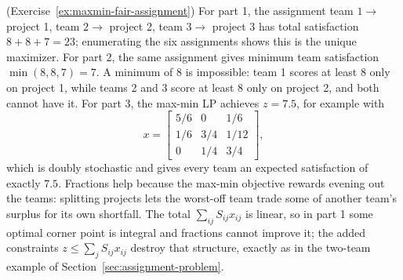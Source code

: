 \begin{solution}(Exercise~\ref{ex:maxmin-fair-assignment})
For part 1, the assignment team $1 \to$ project 1, team $2 \to$ project 2, team $3 \to$ project 3 has total satisfaction $8 + 8 + 7 = 23$; enumerating the six assignments shows this is the unique maximizer.  For part 2, the same assignment gives minimum team satisfaction $\min(8,8,7) = 7$.  A minimum of $8$ is impossible: team 1 scores at least $8$ only on project 1, while teams 2 and 3 score at least $8$ only on project 2, and both cannot have it.  For part 3, the max-min LP achieves $z = 7.5$, for example with
\[
x = \begin{bmatrix} 5/6 & 0 & 1/6 \\ 1/6 & 3/4 & 1/12 \\ 0 & 1/4 & 3/4 \end{bmatrix},
\]
which is doubly stochastic and gives every team an expected satisfaction of exactly $7.5$.  Fractions help because the max-min objective rewards evening out the teams: splitting projects lets the worst-off team trade some of another team's surplus for its own shortfall.  The total $\sum_{ij} S_{ij} x_{ij}$ is linear, so in part 1 some optimal corner point is integral and fractions cannot improve it; the added constraints $z \leq \sum_j S_{ij} x_{ij}$ destroy that structure, exactly as in the two-team example of Section~\ref{sec:assignment-problem}.
\end{solution}



